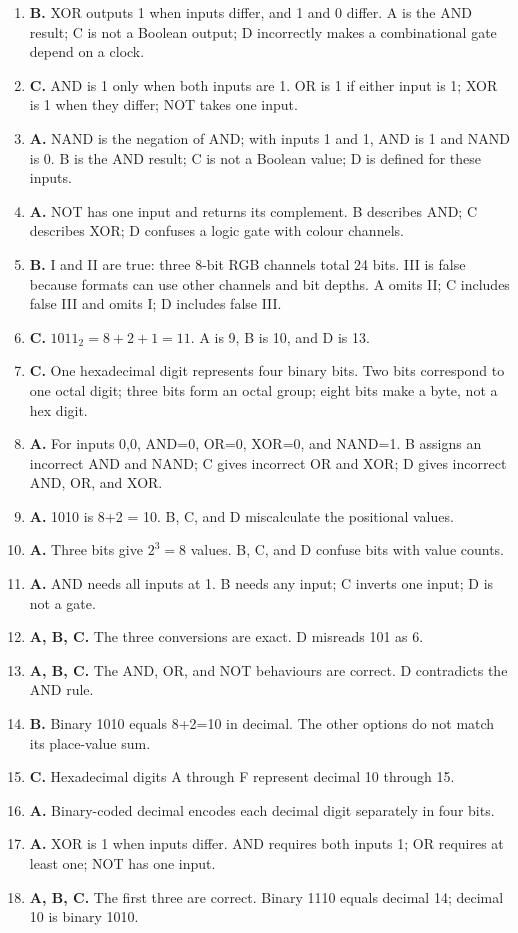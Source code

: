 \begin{enumerate}[label=\textbf{Q\arabic*.}, leftmargin=*]
  names.
\item \textbf{B.} XOR outputs 1 when inputs differ, and 1 and 0 differ. A is
  the AND result; C is not a Boolean output; D incorrectly makes a
  combinational gate depend on a clock.
\item \textbf{C.} AND is 1 only when both inputs are 1. OR is 1 if either
  input is 1; XOR is 1 when they differ; NOT takes one input.
\item \textbf{A.} NAND is the negation of AND; with inputs 1 and 1, AND is 1
  and NAND is 0. B is the AND result; C is not a Boolean value; D is defined
  for these inputs.
\item \textbf{A.} NOT has one input and returns its complement. B describes
  AND; C describes XOR; D confuses a logic gate with colour channels.
\item \textbf{B.} I and II are true: three 8-bit RGB channels total 24 bits.
  III is false because formats can use other channels and bit depths. A
  omits II; C includes false III and omits I; D includes false III.
\item \textbf{C.} $1011_2=8+2+1=11$. A is 9, B is 10, and D is 13.
\item \textbf{C.} One hexadecimal digit represents four binary bits.
  Two bits correspond to one octal digit; three bits form an octal group;
  eight bits make a byte, not a hex digit.
\item \textbf{A.} For inputs 0,0, AND=0, OR=0, XOR=0, and NAND=1. B assigns
  an incorrect AND and NAND; C gives incorrect OR and XOR; D gives
  incorrect AND, OR, and XOR.

\item \textbf{A.} 1010 is 8+2 = 10. B, C, and D miscalculate the positional values.
\item \textbf{A.} Three bits give $2^3 = 8$ values. B, C, and D confuse bits with value counts.
\item \textbf{A.} AND needs all inputs at 1. B needs any input; C inverts one input; D is not a gate.
\item \textbf{A, B, C.} The three conversions are exact. D misreads 101 as 6.
\item \textbf{A, B, C.} The AND, OR, and NOT behaviours are correct. D contradicts the AND rule.
\item \textbf{B.} Binary 1010 equals 8+2=10 in decimal. The other options do not match its place-value sum.

\item \textbf{C.} Hexadecimal digits A through F represent decimal 10 through 15.

\item \textbf{A.} Binary-coded decimal encodes each decimal digit separately in four bits.

\item \textbf{A.} XOR is 1 when inputs differ. AND requires both inputs 1; OR requires at least one; NOT has one input.

\item \textbf{A, B, C.} The first three are correct. Binary 1110 equals decimal 14; decimal 10 is binary 1010.

\end{enumerate}
